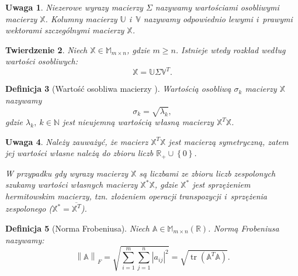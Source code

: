 \documentclass[12pt,a4paper]{report}
\newtheorem{df}{Definicja}[chapter]
\newtheorem{tw}[df]{Twierdzenie}
\newtheorem{uwaga}[df]{Uwaga}
\newcommand{\set}[1]{\left\lbrace {#1} \right\rbrace}
\newcommand{\setR}{\mathbb{R}}
\newcommand{\setN}{\mathbb{N}}
\newcommand{\norm}[2][]{\left\| {#2} \right\|_{#1}}
\newcommand{\tr}[1]{\operatorname{tr}\left({#1} \right)}
\begin{document}
\begin{uwaga}{\citep{ulafiir}}
Niezerowe wyrazy macierzy $\Sigma$ nazywamy wartościami osobliwymi macierzy $\mathbb{X}$.
Kolumny macierzy $\mathbb{U}$ i~$\mathbb{V}$ nazywamy odpowiednio lewymi i~prawymi wektorami szczególnymi macierzy $\mathbb{X}$.
\end{uwaga}

\begin{tw}{\citep{tsvdalra}}
Niech $\mathbb{X} \in \mathbb{M}_{m \times n} $, gdzie $m\geq n$. Istnieje wtedy rozkład według wartości osobliwych:
$$
\mathbb{X} = \mathbb{U} \Sigma \mathbb{V}^T.
$$
\end{tw}

\begin{df}[Wartość osobliwa macierzy \citep{woin}]
Wartością osobliwą $\sigma_k$ macierzy $\mathbb{X}$ nazywamy
$$
\sigma_k = \sqrt{\lambda_k},
$$
gdzie $\lambda_k, \: k \in \setN$ jest nieujemną wartością własną macierzy $\mathbb{X}^T \mathbb{X}$.
\end{df}
\begin{uwaga}
Należy zauważyć, że macierz $\mathbb{X}^T \mathbb{X}$ jest macierzą symetryczną, zatem jej wartości własne należą do zbioru liczb $\setR_{+} \cup \set{0}$.

W przypadku gdy wyrazy macierzy $\mathbb{X}$ są liczbami ze zbioru liczb zespolonych szukamy wartości własnych macierzy $\mathbb{X}^*\mathbb{X}$, gdzie $\mathbb{X}^*$ jest sprzężeniem hermitowskim macierzy, tzn. złożeniem operacji transpozycji i~sprzężenia zespolonego ($\mathbb{X}^* = \overline{\mathbb{X}^T}$).
\end{uwaga}

\begin{df}[Norma Frobeniusa{\citep{ulafiir}}] %
Niech $\mathbb{A}\in \mathbb{M}_{m\times n}(\mathbb{R})$. Normą Frobeniusa nazywamy:
$$
{\norm{\mathbb{A}}}_F = \sqrt{\sum_{i=1}^m \sum_{j=1}^n |a_{ij}|^2} = \sqrt{\tr{\mathbb{A}^T \mathbb{A}}}.
$$
\end{df}
\end{document}
